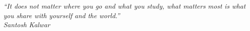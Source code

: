 \begin{flushright}
\emph{``It does not matter where you go and what you study, what matters most is what you share with yourself and the world.''\\
Santosh Kalwar 
}
\end{flushright}

\clearpage
